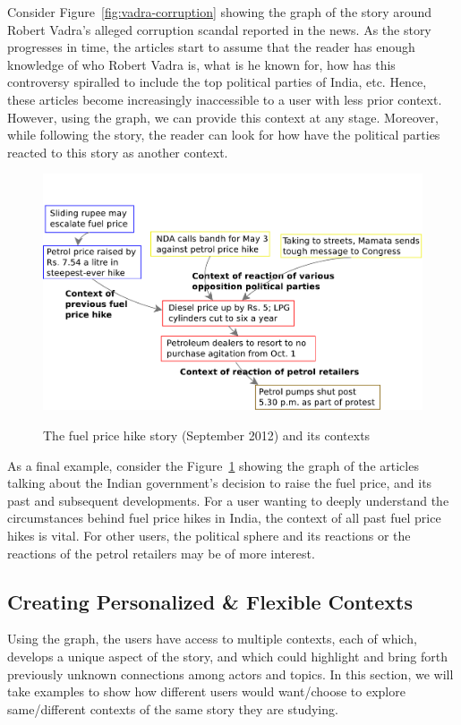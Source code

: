 Consider Figure~\ref{fig:vadra-corruption} showing the graph of the story around Robert Vadra's alleged
corruption scandal reported in the news. As the story progresses in time, the articles
start to assume that the reader has enough knowledge of who Robert Vadra is, what is he known for,
how has this controversy spiralled to include the top political parties of India, etc. Hence, these articles
become increasingly inaccessible to a user with less prior context. However, 
using the graph, we can provide this context at any stage. Moreover, while following the story, 
the reader can look for how have the political parties reacted to this story as another context.

\begin{figure}
\caption{The fuel price hike story (September 2012) and its contexts}
\includegraphics[scale=0.32]{figures/graph-petrol.pdf}
\label{fig:petrol}
\end{figure}

As a final example, consider the Figure~\ref{fig:petrol} showing the graph of the articles talking
about the Indian government's decision to raise the fuel price, and its past and subsequent developments. 
For a user wanting to deeply understand the circumstances behind fuel price hikes in India, the context of 
all past fuel price hikes is vital. For other users, the political
sphere and its reactions or the reactions of the petrol retailers may be of more interest.

\subsection{Creating Personalized \& Flexible Contexts}
Using the graph, the users have access to multiple contexts, each of which, 
develops a unique aspect of the story, and which
could highlight and bring forth previously unknown connections among
actors and topics. In this section, we will take examples to show how
different users would want/choose to explore same/different contexts
of the same story they are studying.

